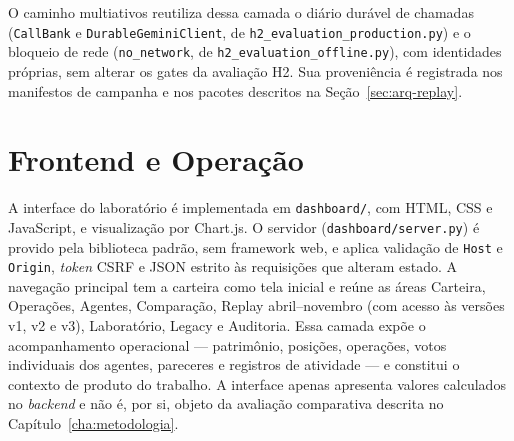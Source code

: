 O caminho multiativos reutiliza dessa camada o diário durável de chamadas (\texttt{CallBank} e \texttt{DurableGeminiClient}, de \texttt{h2\_evaluation\_production.py}) e o bloqueio de rede (\texttt{no\_network}, de \texttt{h2\_evaluation\_offline.py}), com identidades próprias, sem alterar os gates da avaliação H2. Sua proveniência é registrada nos manifestos de campanha e nos pacotes descritos na Seção~\ref{sec:arq-replay}.

\section{Frontend e Operação}

A interface do laboratório é implementada em \texttt{dashboard/}, com HTML, CSS e JavaScript, e visualização por Chart.js. O servidor (\texttt{dashboard/server.py}) é provido pela biblioteca padrão, sem framework web, e aplica validação de \texttt{Host} e \texttt{Origin}, \textit{token} CSRF e JSON estrito às requisições que alteram estado. A navegação principal tem a carteira como tela inicial e reúne as áreas Carteira, Operações, Agentes, Comparação, Replay abril--novembro (com acesso às versões v1, v2 e v3), Laboratório, Legacy e Auditoria. Essa camada expõe o acompanhamento operacional --- patrimônio, posições, operações, votos individuais dos agentes, pareceres e registros de atividade --- e constitui o contexto de produto do trabalho. A interface apenas apresenta valores calculados no \textit{backend} e não é, por si, objeto da avaliação comparativa descrita no Capítulo~\ref{cha:metodologia}.
